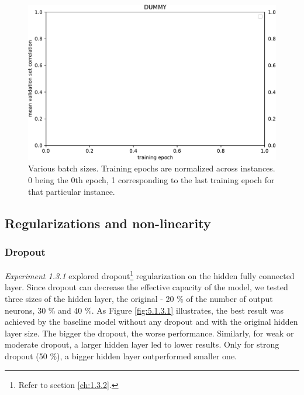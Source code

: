 \begin{figure}[H]
    \centering
    \includegraphics[width=1\textwidth]{../figures/05_dummy}
    \caption[Experiment 5.1.2.6]{Various batch sizes. Training epochs are normalized across instances. 0 being the 0th epoch, 1 corresponding to the last training epoch for that particular instance.}
    \label{fig:5.1.2.6}
\end{figure}

\subsection{Regularizations and non-linearity}
\subsubsection{Dropout}

\textit{Experiment 1.3.1} explored dropout\footnote{Refer to section \ref{ch:1.3.2}.} regularization on the hidden fully connected layer. Since dropout can decrease the effective capacity of the model, we tested three sizes of the hidden layer, the original - 20 \% of the number of output neurons, 30 \% and 40 \%. As Figure \ref{fig:5.1.3.1} illustrates, the best result was achieved by the baseline model without any dropout and with the original hidden layer size. The bigger the dropout, the worse performance. Similarly, for weak or moderate dropout, a larger hidden layer led to lower results. Only for strong dropout (50 \%), a bigger hidden layer outperformed smaller one.


